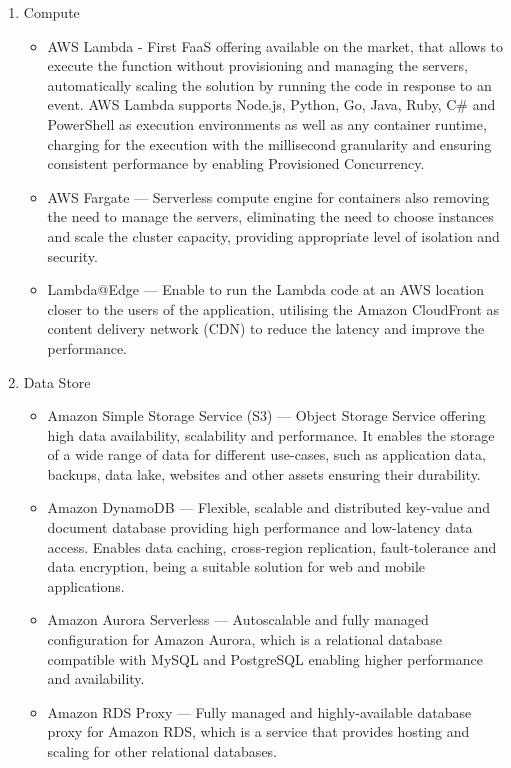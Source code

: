 \begin{enumerate}
   \item Compute
   \begin{itemize}
       \item AWS Lambda - First FaaS offering available on the market, that allows to execute the function without provisioning and managing the servers, automatically scaling the solution by running the code in response to an event. AWS Lambda supports Node.js, Python, Go, Java, Ruby, C\# and PowerShell as execution environments as well as any container runtime, charging for the execution with the millisecond granularity and ensuring consistent performance by enabling Provisioned Concurrency.
       \item AWS Fargate --- Serverless compute engine for containers also removing the need to manage the servers, eliminating the need to choose instances and scale the cluster capacity, providing appropriate level of isolation and security.
       \item Lambda@Edge --- Enable to run the Lambda code at an AWS location closer to the users of the application, utilising the Amazon CloudFront as content delivery network (CDN) to reduce the latency and improve the performance.
   \end{itemize}
   \item Data Store
   \begin{itemize}
       \item Amazon Simple Storage Service (S3) --- Object Storage Service offering high data availability, scalability and performance. It enables the storage of a wide range of data for different use-cases, such as application data, backups, data lake, websites and other assets ensuring their durability.
       \item Amazon DynamoDB --- Flexible, scalable and distributed key-value and document database providing high performance and low-latency data access. Enables data caching, cross-region replication, fault-tolerance and data encryption, being a suitable solution for web and mobile applications.
       \item Amazon Aurora Serverless --- Autoscalable and fully managed configuration for Amazon Aurora, which is a relational database compatible with MySQL and PostgreSQL enabling higher performance and availability.
       \item Amazon RDS Proxy --- Fully managed and highly-available database proxy for Amazon RDS, which is a service that provides hosting and scaling for other relational databases.

\end{itemize}
\end{enumerate}
